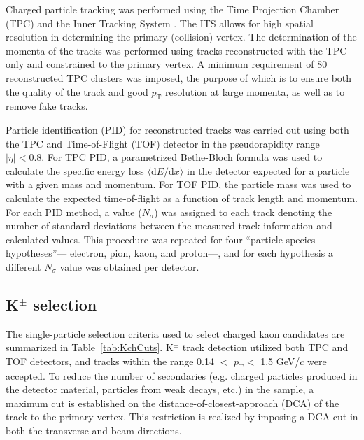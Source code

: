 \documentclass[ALICE,manyauthors]{cernphprep}
\newcommand{\pt}{$p_{\mathrm{T}}$\xspace}
\newcommand{\Kpm}{$\mathrm{K^{\pm}}$\xspace}
\begin{document}
Charged particle tracking was performed using the Time Projection Chamber (TPC) \cite{2010NIMPA.622..316A} and the Inner Tracking System \cite{0954-3899-41-8-087002}.  
The ITS allows for high spatial resolution in determining the primary (collision) vertex.
The determination of the momenta of the tracks was performed using tracks reconstructed with the TPC only and constrained to the primary vertex.
A minimum requirement of 80 reconstructed TPC clusters was imposed, the purpose of which is to ensure both the quality of the track and good \pt resolution at large momenta, as well as to remove fake tracks.

Particle identification (PID) for reconstructed tracks was carried out using both the TPC and Time-of-Flight (TOF) detector \cite{Abelev:2014ffa, Akindinov:2013tea} in the pseudorapidity range $|\eta| < 0.8$.  
For TPC PID, a parametrized Bethe-Bloch formula was used to calculate the specific energy loss $\langle \mathrm{d}E/\mathrm{d}x \rangle$ in the detector expected for a particle with a given mass and momentum.  
For TOF PID, the particle mass was used to calculate the expected time-of-flight as a function of track length and momentum.  
For each PID method, a value ($N_{\sigma}$) was assigned to each track denoting the number of standard deviations between the measured track information and calculated values.  
This procedure was repeated for four ``particle species hypotheses''--- electron, pion, kaon, and proton---, and for each hypothesis a different $N_{\sigma}$ value was obtained per detector.

\subsection{K$^{\pm}$ selection}
\label{sec:KchSelection}
The single-particle selection criteria used to select charged kaon candidates are summarized in Table~\ref{tab:KchCuts}.
\Kpm track detection utilized both TPC and TOF detectors, and tracks within the range 0.14 $<$ \pt $<$ 1.5 GeV/$c$ were accepted.
To reduce the number of secondaries (e.g. charged particles produced in the detector material, particles from weak decays, etc.) in the sample, a maximum cut is established on the distance-of-closest-approach (DCA) of the track to the primary vertex.
This restriction is realized by imposing a DCA cut in both the transverse and beam directions.
\end{document}
